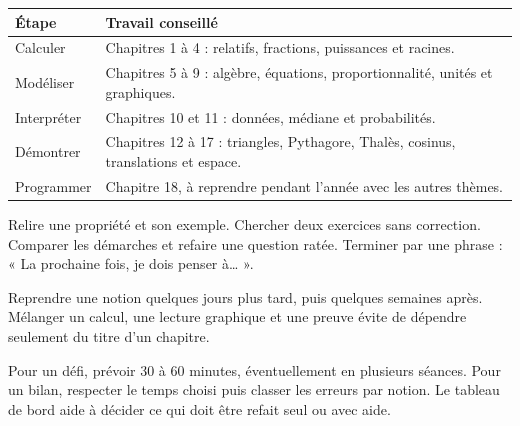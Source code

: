 \clearpage\thispagestyle{otFront}\label{parcours}\fontsize{11}{15}\selectfont

\begin{tabularx}{\linewidth}{@{}lY@{}}\toprule
Étape & Travail conseillé\\\midrule
Calculer & Chapitres 1 à 4 : relatifs, fractions, puissances et racines.\\[3mm]
Modéliser & Chapitres 5 à 9 : algèbre, équations, proportionnalité, unités et graphiques.\\[3mm]
Interpréter & Chapitres 10 et 11 : données, médiane et probabilités.\\[3mm]
Démontrer & Chapitres 12 à 17 : triangles, Pythagore, Thalès, cosinus, translations et espace.\\[3mm]
Programmer & Chapitre 18, à reprendre pendant l’année avec les autres thèmes.\\\bottomrule
\end{tabularx}
\begin{savoirfaire}Relire une propriété et son exemple. Chercher deux exercices sans correction. Comparer les démarches et refaire une question ratée. Terminer par une phrase : « La prochaine fois, je dois penser à… ».\end{savoirfaire}
\begin{savoirfaire}Reprendre une notion quelques jours plus tard, puis quelques semaines après. Mélanger un calcul, une lecture graphique et une preuve évite de dépendre seulement du titre d’un chapitre.\end{savoirfaire}
Pour un défi, prévoir 30 à 60 minutes, éventuellement en plusieurs séances.
Pour un bilan, respecter le temps choisi puis classer les erreurs par notion.
Le tableau de bord aide à décider ce qui doit être refait seul ou avec aide.

\clearpage

